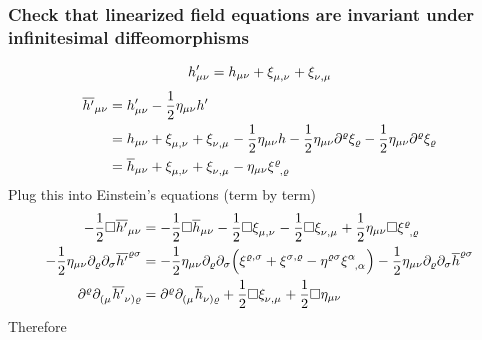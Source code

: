 \subsubsection{Check that linearized field equations are invariant under infinitesimal diffeomorphisms}
\begin{equation}
    h'_{\mu\nu} = h_{\mu\nu} + \tensor{\xi}{_\mu_,_\nu} + \tensor{\xi}{_\nu_,_\mu}
\end{equation}
\begin{equation}
    \begin{split}
        \overline{h'}_{\mu\nu} &= h'_{\mu\nu} - \frac{1}{2} \eta_{\mu\nu}h' \\
        &= h_{\mu\nu} + \tensor{\xi}{_\mu_,_\nu} + \tensor{\xi}{_\nu_,_\mu} - \frac{1}{2} \eta_{\mu\nu}h
        -\frac{1}{2}\eta_{\mu\nu}\partial^\varrho\xi_\varrho - \frac{1}{2} \eta_{\mu\nu}\partial^\varrho\xi_\varrho \\
        &= \overline{h}_{\mu\nu} + \tensor{\xi}{_\mu_,_\nu} + \tensor{\xi}{_\nu_,_\mu} - \eta_{\mu\nu}\tensor{\xi}{^\varrho_,_\varrho}
    \end{split}
\end{equation}
Plug this into Einstein's equations (term by term)
\begin{align}
    -\frac{1}{2}\Box \overline{h'}_{\mu\nu} &= -\frac{1}{2}\Box\overline{h}_{\mu\nu} - \frac{1}{2}\Box\tensor{\xi}{_\mu_,_\nu}
    -\frac{1}{2}\Box\tensor{\xi}{_\nu_,_\mu} + \frac{1}{2} \eta_{\mu\nu}\Box\tensor{\xi}{^\varrho_,_\varrho} \\
    -\frac{1}{2} \eta_{\mu\nu}\partial_\varrho\partial_\sigma \overline{h'}^{\varrho\sigma} &=
    -\frac{1}{2} \eta_{\mu\nu}\partial_\varrho\partial_\sigma \left( \tensor{\xi}{^\varrho^,^\sigma} + \tensor{\xi}{^\sigma^,^\varrho}
    - \eta^{\varrho\sigma} \tensor{\xi}{^\alpha_,_\alpha} \right) - \frac{1}{2} \eta_{\mu\nu}\partial_\varrho\partial_\sigma \overline{h}^{\varrho\sigma} \\
    \partial^\varrho \tensor{\partial}{_(_\mu} \tensor{\overline{h'}}{_\nu_)_\varrho} &=
    \partial^\varrho \tensor{\partial}{_(_\mu} \tensor{\overline{h}}{_\nu_)_\varrho} + \frac{1}{2}\Box\tensor{\xi}{_\nu_,_\mu}
    + \frac{1}{2}\Box\eta_{\mu\nu}
\end{align}
Therefore
